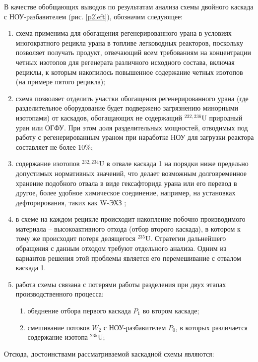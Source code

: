 В качестве обобщающих выводов по результатам анализа схемы двойного каскада с НОУ-разбавителем (рис. \ref{p2left}), обозначим следующее:
\begin{enumerate}
    \item схема применима для обогащения регенерированного урана в условиях многократного рецикла урана в топливе легководных реакторов, поскольку позволяет получать продукт, отвечающий всем требованиям на концентрации четных изотопов для регенерата различного исходного состава, включая рециклы, к которым накопилось повышенное содержание четных изотопов (на примере пятого рецикла);
    \item схема позволяет отделить участки обогащения регенерированного урана (где разделительное оборудование будет подвержено загрязнению минорными изотопами) от каскадов, обогащающих не содержащий $^{232,236}$U природный уран или ОГФУ. При этом доля разделительных мощностей, отводимых под работу с регенерированным ураном при наработке НОУ для загрузки реактора составляет не более 10\%;
    \item содержание изотопов $^{232,234}$U в отвале каскада 1 на порядки ниже предельно допустимых нормативных значений, что делает возможным долговременное хранение подобного отвала в виде гексафторида урана или его перевод в другое, более удобное химическое соединение, например, на установках дефторирования, таких как W-ЭХЗ \cite{oecdManagementDepletedUranium2001};
    \item в схеме на каждом рецикле происходит накопление побочно производимого материала -- высокоактивного отхода (отбор второго каскада), в котором к тому же происходит потеря делящегося $^{235}$U. Стратегии дальнейшего обращения с данным отходом требуют отдельного анализа. Одним из вариантов решения этой проблемы является его перемешивание с отвалом каскада 1.
    \item работа схемы связана с потерями работы разделения при двух этапах производственного процесса:
    \begin{enumerate}
        \item обеднение отбора первого каскада $P_1$ во втором каскаде;
        \item смешивание потоков $W_2$ с НОУ-разбавителем $P_0$, в которых различается содержание изотопа $^{235}$U;
    \end{enumerate}
\end{enumerate}

Отсюда, достоинствами рассматриваемой каскадной схемы являются:

